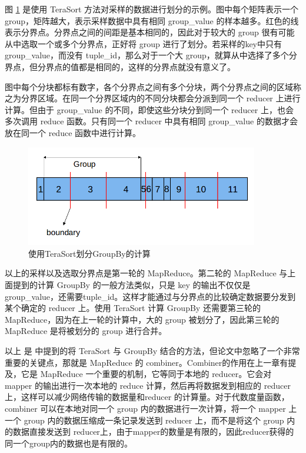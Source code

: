 图 \ref{ts_groupby} 是使用 TeraSort 方法对采样的数据进行划分的示例。图中每个矩阵表示一个 group，矩阵越大，表示采样数据中具有相同 group\_value 的样本越多。红色的线表示分界点。分界点之间的间距是基本相同的，因此对于较大的 group 很有可能从中选取一个或多个分界点，正好将 group 进行了划分。若采样的key中只有 group\_value，而没有 tuple\_id，那么对于一个大 group，就算从中选择了多个分界点，但分界点的值都是相同的，这样的分界点就没有意义了。

图中每个分块都标有数字，各个分界点之间有多个分块，两个分界点之间的区域称之为分界区域。在同一个分界区域内的不同分块都会分派到同一个 reducer 上进行计算。但由于 group\_value 的不同，即使这些分块分到同一个 reducer 上，也会多次调用 reduce 函数。只有同一个 reducer 中具有相同 group\_value 的数据才会放在同一个 reduce 函数中进行计算。

\begin{figure}[!ht] 
\centering\includegraphics[width=4in]{picture/ch_terasort_mr/ts_groupby} 
\caption{使用TeraSort划分GroupBy的计算}\label{ts_groupby} 
\end{figure}

以上的采样以及选取分界点是第一轮的 MapReduce。第二轮的 MapReduce 与上面提到的计算 GroupBy 的一般方法类似，只是 key 的输出不仅仅是 group\_value，还需要tuple\_id。这样才能通过与分界点的比较确定数据要分发到某个确定的 reducer 上。使用 TeraSort 计算 GroupBy 还需要第三轮的 MapReduce，因为在上一轮的计算中，大的 group 被划分了，因此第三轮的 MapReduce 是将被划分的 group 进行合并。

以上 是 \cite{tao2013minimal} 中提到的将 TeraSort 与 GroupBy 结合的方法，但论文中忽略了一个非常重要的关键点，那就是 MapReduce 的 combiner。Combiner的作用在上一章有提及，它是 MapReduce 一个重要的机制，它等同于本地的 reducer。它会对 mapper 的输出进行一次本地的 reduce 计算，然后再将数据发到相应的 reducer 上，这样可以减少网络传输的数据量和reducer 的计算量。对于代数度量函数，combiner 可以在本地对同一个 group 内的数据进行一次计算，将一个 mapper 上一个 group 内的数据压缩成一条记录发送到 reducer 上，而不是将这个 group 内的数据直接发送到 reducer上，由于mapper的数量是有限的，因此reducer获得的同一个group内的数据也是有限的。


